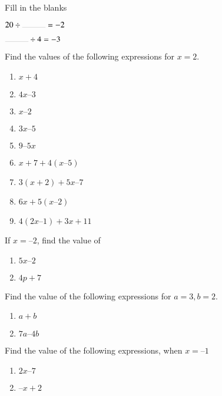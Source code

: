 Fill in the blanks
\begin{enumerate}[label=\thesubsection.\arabic*, ref=\thesubsection.\theenumi,resume*]
	\begin{multicols}{2}
		\item	$20 \div \rule{1cm}{0.1pt}=-2$
		\item	$\rule{1cm}{0.1pt}\div 4=-3$
	\end{multicols}
\end{enumerate}
Find the values of the following expressions for $x = 2$. 
	\begin{multicols}{3}
\begin{enumerate}[label=\thesubsection.\arabic*, ref=\thesubsection.\theenumi,resume*]
\item $x + 4$
\item  $4x – 3$ 
\item $ x – 2$
\item $ 3x – 5 $
\item $ 9 – 5x $
\item $ x + 7 + 4 (x – 5)$
\item $ 3 (x + 2) + 5x – 7 $
\item $ 6x + 5 (x – 2) $
\item $ 4(2x – 1) + 3x + 11$
\end{enumerate}
\end{multicols}
If $x = – 2$, find the value of
	\begin{multicols}{2}
\begin{enumerate}[label=\thesubsection.\arabic*, ref=\thesubsection.\theenumi,resume*]
\item $5x – 2$
\item $4p + 7$
\end{enumerate}
\end{multicols}
Find the value of the following expressions for $a = 3, b = 2$. 
	\begin{multicols}{2}
\begin{enumerate}[label=\thesubsection.\arabic*, ref=\thesubsection.\theenumi,resume*]
\item $a + b$				
\item $ 7a – 4b $
\end{enumerate}
\end{multicols}
Find the value of the following expressions, when $x = –1$ 
\begin{enumerate}[label=\thesubsection.\arabic*, ref=\thesubsection.\theenumi,resume*]
\item $ 2x – 7$
\item $ – x + 2$ 
\end{enumerate}
